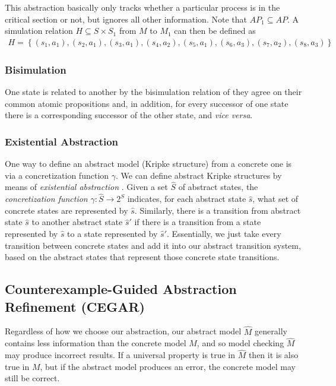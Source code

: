 \documentclass[10pt,a4paper]{article}
\begin{document}
This abstraction basically only tracks whether a particular process is in the critical section or not, but ignores all other information. Note that $AP_1 \subseteq AP$. A simulation relation $H \subseteq S \times S_1$ from $M$ to $M_1$ can then be defined as 
\begin{align*}
    H = \left\lbrace (s_1, a_1), (s_2, a_1), (s_3, a_1), (s_4, a_2), (s_5, a_1), (s_6, a_3), (s_7, a_2), (s_8, a_3) \right\rbrace
\end{align*}

\subsubsection*{Bisimulation}

One state is related to another by the bisimulation relation of they agree on their common atomic propositions and, in addition, for every successor of one state there is a corresponding successor of the other state, and \textit{vice versa}.

\subsubsection*{Existential Abstraction}

One way to define an abstract model (Kripke structure) from a concrete one is via a concretization function $\gamma$. We can define abstract Kripke structures by means of \textit{existential abstraction} \cite{94mcabs}. Given a set $\widehat{S}$ of abstract states, the \textit{concretization function} $\gamma : \widehat{S} \rightarrow 2^S$ indicates, for each abstract state $\widehat{s}$, what set of concrete states are represented by $\widehat{s}$. Similarly, there is a transition from abstract state $\widehat{s}$ to another abstract state $\widehat{s}'$ if there is a transition from a state represented by $\widehat{s}$ to a state represented by $\widehat{s}'$. Essentially, we just take every transition between concrete states and add it into our abstract transition system, based on the abstract states that represent those concrete state transitions.

\subsection*{Counterexample-Guided Abstraction Refinement (CEGAR)}


Regardless of how we choose our abstraction, our abstract model $\widehat{M}$ generally contains less information than the concrete model $M$, and so model checking $\widehat{M}$ may produce incorrect results. If a universal property is true in $\widehat{M}$ then it is also true in $M$, but if the abstract model produces an error, the concrete model may still be correct.
\end{document}
